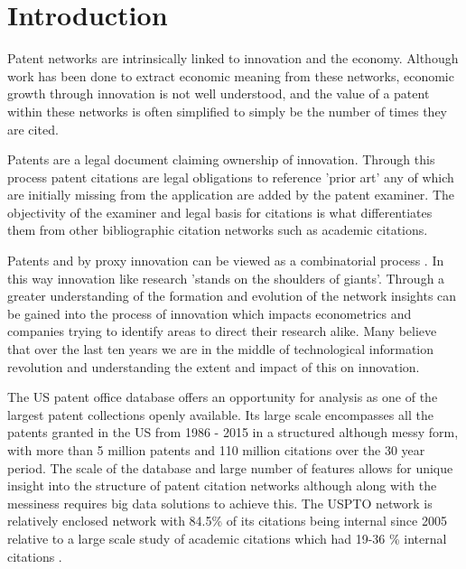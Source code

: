 
\chapter{Introduction} %

\label{Chapter1} %

Patent networks are intrinsically linked to innovation and the economy. Although work has been done to extract economic meaning from these networks, economic growth through innovation is not well understood, and the value of a patent within these networks is often simplified to simply be the number of times they are cited.

Patents are a legal document claiming ownership of innovation. Through this process patent citations are legal obligations to reference 'prior art' any of which are initially missing from the application are added by the patent examiner. The objectivity of the examiner and legal basis for citations is what differentiates them from other bibliographic citation networks such as academic citations. 

Patents and by proxy innovation can be viewed as a combinatorial process \cite{youn2015invention}. In this way innovation like research 'stands on the shoulders of giants'. Through a greater understanding of the formation and evolution of the network insights can be gained into the process of innovation which impacts econometrics and companies trying to identify areas to direct their research alike. Many believe that over the last ten years we are in the middle of technological information revolution \cite{castells2011rise} and understanding the extent and impact of this on innovation. 

The US patent office database offers an opportunity for analysis as one of the largest patent collections openly available. Its large scale encompasses all the patents granted in the US from 1986 - 2015 in a structured although messy form, with more than 5 million patents and 110 million citations over the 30 year period.  The scale of the database and large number of features allows for unique insight into the structure of patent citation networks although along with the messiness requires big data solutions to achieve this. The USPTO network is relatively enclosed network with 84.5\% of its citations being internal since 2005 relative to a large scale study of academic citations which had 19-36 \% internal citations \cite{redner2004citation}. 

